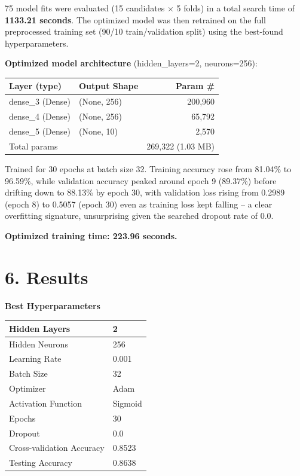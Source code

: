 \documentclass[11pt]{article}
\begin{document}
75 model fits were evaluated (15 candidates $\times$ 5 folds) in a total search time of \textbf{1133.21 seconds}. The optimized model was then retrained on the full preprocessed training set (90/10 train/validation split) using the best-found hyperparameters.

\textbf{Optimized model architecture} (hidden\_layers=2, neurons=256):

\begin{center}
\begin{tabular}{|l|l|r|}
\hline
\textbf{Layer (type)} & \textbf{Output Shape} & \textbf{Param \#} \\
\hline
dense\_3 (Dense) & (None, 256) & 200,960 \\
dense\_4 (Dense) & (None, 256) & 65,792 \\
dense\_5 (Dense) & (None, 10) & 2,570 \\
\hline
\multicolumn{2}{|l|}{Total params} & 269,322 (1.03 MB) \\
\hline
\end{tabular}
\end{center}

Trained for 30 epochs at batch size 32. Training accuracy rose from 81.04\% to 96.59\%, while validation accuracy peaked around epoch 9 (89.37\%) before drifting down to 88.13\% by epoch 30, with validation loss rising from 0.2989 (epoch 8) to 0.5057 (epoch 30) even as training loss kept falling -- a clear overfitting signature, unsurprising given the searched dropout rate of 0.0.

\textbf{Optimized training time: 223.96 seconds.}

\section*{6. Results}

\textbf{Best Hyperparameters}

\begin{center}
\begin{tabular}{|p{6cm}|p{6cm}|}
\hline
Hidden Layers & 2\\\hline
Hidden Neurons & 256\\\hline
Learning Rate & 0.001\\\hline
Batch Size & 32\\\hline
Optimizer & Adam\\\hline
Activation Function & Sigmoid\\\hline
Epochs & 30\\\hline
Dropout & 0.0\\\hline
Cross-validation Accuracy & 0.8523\\\hline
Testing Accuracy & 0.8638\\\hline
\end{tabular}
\end{center}
\end{document}
